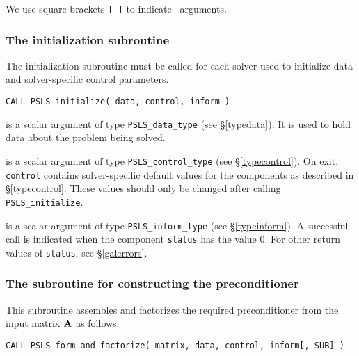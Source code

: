 \documentclass{galahad}
\newcommand{\packagename}{PSLS}
\begin{document}

\galarguments
We use square brackets {\tt [ ]} to indicate \optional\ arguments.


\subsubsection{The initialization subroutine}\label{subinit}
The initialization subroutine must be called for each solver used
to initialize data and solver-specific control parameters.

\hskip0.5in
{\tt CALL \packagename\_initialize( data, control, inform )}
\begin{description}

 is a scalar \intentout argument of type
{\tt \packagename\_data\_type}
(see \S\ref{typedata}). It is used to hold data about the problem being
solved.

 is a scalar \intentout argument of type
{\tt \packagename\_control\_type}
(see \S\ref{typecontrol}).
On exit, {\tt control} contains solver-specific default values for the
components as described in \S\ref{typecontrol}.
These values should only be changed after calling
{\tt \packagename\_initialize}.

 is a scalar \intentout argument of type
{\tt \packagename\_inform\_type}
(see \S\ref{typeinform}).
A successful call is indicated when the  component {\tt status} has the value 0.
For other return values of {\tt status}, see \S\ref{galerrors}.

\end{description}


\subsubsection{The subroutine for constructing the preconditioner}
This subroutine assembles and factorizes the required preconditioner
from the input matrix ${\mathbf{A}}$ as follows:

\hskip0.5in
{\tt CALL \packagename\_form\_and\_factorize( matrix, data, control, inform[, SUB] )}
\end{document}
